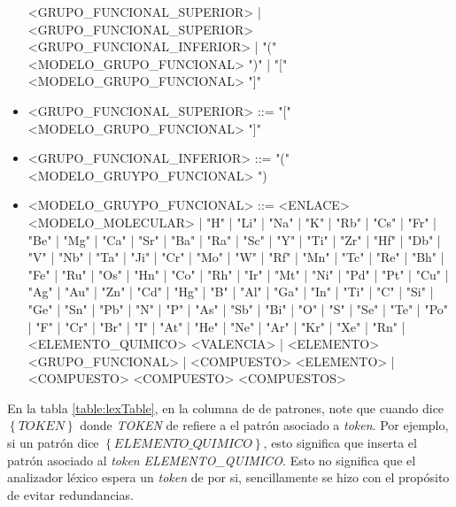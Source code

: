 \begin{itemize}
          <GRUPO\_FUNCIONAL\_SUPERIOR> | <GRUPO\_FUNCIONAL\_SUPERIOR> <GRUPO\_FUNCIONAL\_INFERIOR> | "(" <MODELO\_GRUPO\_FUNCIONAL> ")" | "["  <MODELO\_GRUPO\_FUNCIONAL> "]"
    \item <GRUPO\_FUNCIONAL\_SUPERIOR> ::= "[" <MODELO\_GRUPO\_FUNCIONAL> "]"
    \item <GRUPO\_FUNCIONAL\_INFERIOR> ::= "(" <MODELO\_GRUYPO\_FUNCIONAL> ")
    \item  <MODELO\_GRUYPO\_FUNCIONAL> ::= <ENLACE> <MODELO\_MOLECULAR> | "H" | "Li" | "Na" | "K" | "Rb" | "Cs" | "Fr" | "Be" | "Mg" | "Ca" | "Sr" | "Ba" | "Ra" | "Sc" | "Y" | "Ti" | "Zr" | "Hf" | "Db" | "V" | "Nb" | "Ta" | "Ji" | "Cr" | "Mo" | "W" | "Rf" | "Mn" | "Tc" | "Re" | "Bh" | "Fe" | "Ru" | "Os" | "Hn" | "Co" | "Rh" | "Ir" | "Mt" | "Ni" | "Pd" | "Pt" | "Cu" | "Ag" | "Au" | "Zn" | "Cd" | "Hg" | "B" | "Al" | "Ga" | "In" | "Ti" | "C" | "Si" | "Ge" | "Sn" | "Pb" | "N" | "P" | "As" | "Sb" | "Bi" | "O" | "S" | "Se" | "Te" | "Po" | "F" | "Cr" | "Br" | "I" | "At" | "He" | "Ne" | "Ar" | "Kr" | "Xe" | "Rn" | <ELEMENTO\_QUIMICO> <VALENCIA> | <ELEMENTO> <GRUPO\_FUNCIONAL> | <COMPUESTO> <ELEMENTO> | <COMPUESTO> <COMPUESTO> <COMPUESTOS>
\end{itemize}
\vspace{1cm}
En la tabla \ref{table:lexTable}, en la columna de de patrones, note que cuando dice $\left\{\textit{TOKEN}\right\}$ donde \textit{TOKEN} de refiere a el patrón asociado a \textit{token}.
Por ejemplo, si un patrón dice $\left\{\textit{ELEMENTO\_QUIMICO}\right\}$, esto significa que inserta el patrón asociado al \textit{token} \textit{ELEMENTO\_QUIMICO}.
Esto no significa que el analizador léxico espera un \textit{token} de por si, sencillamente se hizo con el propósito de evitar redundancias. 
\newpage

